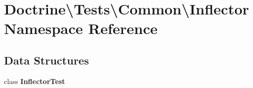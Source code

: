 \section{Doctrine\textbackslash{}Tests\textbackslash{}Common\textbackslash{}Inflector Namespace Reference}
\label{namespace_doctrine_1_1_tests_1_1_common_1_1_inflector}
\subsection*{Data Structures}
\begin{DoxyCompactItemize}
\item 
class {\bf Inflector\+Test}
\end{DoxyCompactItemize}
